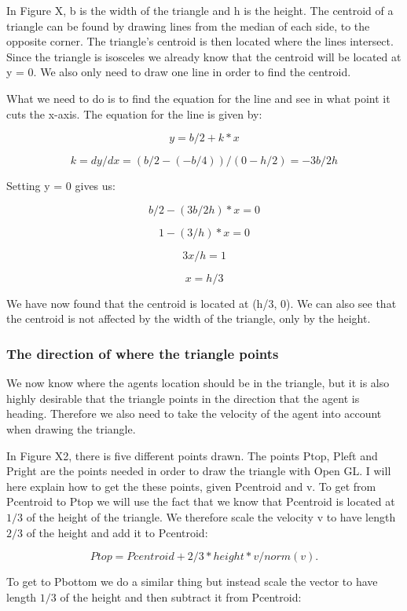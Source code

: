 \documentclass[paper=a4, fontsize=11pt,twoside]{scrartcl}		%
\begin{document}
\begin{flushleft}
In Figure X, b is the width of the triangle and h is the height. The centroid of a triangle can be found by drawing lines from the median of each side, to the opposite corner. The triangle's centroid is then located where the lines intersect. Since the triangle is isosceles we already know that the centroid will be located at y = 0. We also only need to draw one line in order to find the centroid. \newline

What we need to do is to find the equation for the line and see in what point it cuts the x-axis. The equation for the line is given by:

$$y = b/2 + k*x$$

$$k = dy/dx = (b/2-(-b/4))/(0-h/2) = -3b/2h$$

Setting y = 0 gives us:

$$b/2 - (3b/2h)*x = 0$$

$$1-(3/h)*x = 0$$

$$3x/h = 1$$

$$x = h/3$$

We have now found that the centroid is located at (h/3, 0). We can also see that the centroid is not affected by the width of the triangle, only by the height. \newline


\subsubsection{The direction of where the triangle points}

We now know where the agents location should be in the triangle, but it is also highly desirable that the triangle points in the direction that the agent is heading. Therefore we also need to take the velocity of the agent into account when drawing the triangle. \newline

In Figure X2, there is five different points drawn. The points Ptop, Pleft and Pright are the points needed in order to draw the triangle with Open GL. I will here explain how to get the these points, given Pcentroid and v. To get from Pcentroid to Ptop we will use the fact that we know that Pcentroid is located at $1/3$ of the height of the triangle. We therefore scale the velocity v to have length $2/3$ of the height and add it to Pcentroid:

$$Ptop = Pcentroid + 2/3 *height*v/norm(v).$$

To get to Pbottom we do a similar thing but instead scale the vector to have length $1/3$ of the height and then subtract it from Pcentroid:


\end{flushleft}
\end{document}
